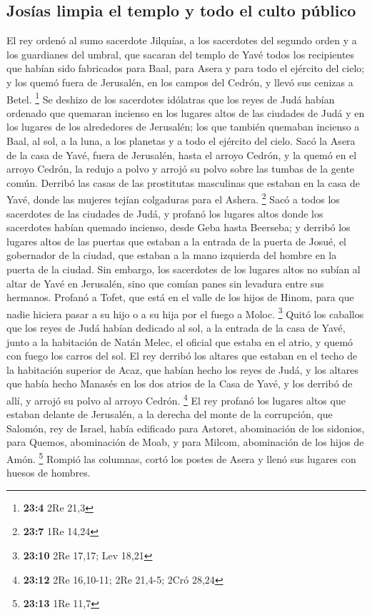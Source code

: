 \begin{paracol}{2}
\hypertarget{josuxedas-limpia-el-templo-y-todo-el-culto-puxfablico}{%
\subsection{Josías limpia el templo y todo el culto
público}\label{josuxedas-limpia-el-templo-y-todo-el-culto-puxfablico}}

 El rey ordenó al sumo sacerdote Jilquías, a los
sacerdotes del segundo orden y a los guardianes del umbral, que sacaran
del templo de Yavé todos los recipientes que habían sido fabricados para
Baal, para Asera y para todo el ejército del cielo; y los quemó fuera de
Jerusalén, en los campos del Cedrón, y llevó sus cenizas a Betel.
\footnote{\textbf{23:4} 2Re 21,3}  Se deshizo de los
sacerdotes idólatras que los reyes de Judá habían ordenado que quemaran
incienso en los lugares altos de las ciudades de Judá y en los lugares
de los alrededores de Jerusalén; los que también quemaban incienso a
Baal, al sol, a la luna, a los planetas y a todo el ejército del cielo.
 Sacó la Asera de la casa de Yavé, fuera de Jerusalén,
hasta el arroyo Cedrón, y la quemó en el arroyo Cedrón, la redujo a
polvo y arrojó su polvo sobre las tumbas de la gente común.
 Derribó las casas de las prostitutas masculinas que
estaban en la casa de Yavé, donde las mujeres tejían colgaduras para el
Ashera. \footnote{\textbf{23:7} 1Re 14,24}  Sacó a todos
los sacerdotes de las ciudades de Judá, y profanó los lugares altos
donde los sacerdotes habían quemado incienso, desde Geba hasta Beerseba;
y derribó los lugares altos de las puertas que estaban a la entrada de
la puerta de Josué, el gobernador de la ciudad, que estaban a la mano
izquierda del hombre en la puerta de la ciudad.  Sin
embargo, los sacerdotes de los lugares altos no subían al altar de Yavé
en Jerusalén, sino que comían panes sin levadura entre sus hermanos.
 Profanó a Tofet, que está en el valle de los hijos de
Hinom, para que nadie hiciera pasar a su hijo o a su hija por el fuego a
Moloc. \footnote{\textbf{23:10} 2Re 17,17; Lev 18,21} 
Quitó los caballos que los reyes de Judá habían dedicado al sol, a la
entrada de la casa de Yavé, junto a la habitación de Natán Melec, el
oficial que estaba en el atrio, y quemó con fuego los carros del sol.
 El rey derribó los altares que estaban en el techo de la
habitación superior de Acaz, que habían hecho los reyes de Judá, y los
altares que había hecho Manasés en los dos atrios de la Casa de Yavé, y
los derribó de allí, y arrojó su polvo al arroyo Cedrón. \footnote{\textbf{23:12}
  2Re 16,10-11; 2Re 21,4-5; 2Cró 28,24}  El rey profanó
los lugares altos que estaban delante de Jerusalén, a la derecha del
monte de la corrupción, que Salomón, rey de Israel, había edificado para
Astoret, abominación de los sidonios, para Quemos, abominación de Moab,
y para Milcom, abominación de los hijos de Amón. \footnote{\textbf{23:13}
  1Re 11,7}  Rompió las columnas, cortó los postes de
Asera y llenó sus lugares con huesos de hombres.


\end{paracol}
